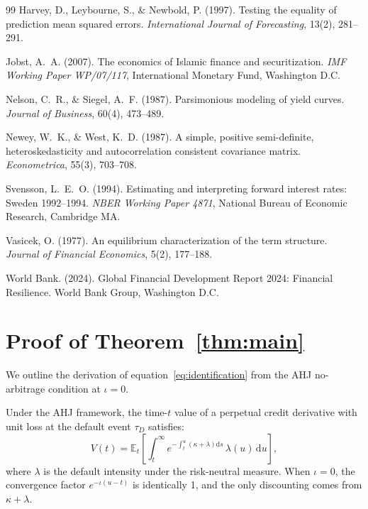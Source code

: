 \documentclass[12pt]{article}
\newcommand{\E}{\mathbb{E}}
\newcommand{\dd}{\mathrm{d}}
\theoremstyle{plain}
\theoremstyle{definition}
\theoremstyle{remark}
\begin{document}
\begin{thebibliography}{99}
Harvey, D., Leybourne, S., \& Newbold, P. (1997).
\newblock Testing the equality of prediction mean squared errors.
\newblock \textit{International Journal of Forecasting}, 13(2), 281--291.

Jobst, A.~A. (2007).
\newblock The economics of Islamic finance and securitization.
\newblock \textit{IMF Working Paper WP/07/117}, International Monetary Fund,
  Washington D.C.

Nelson, C.~R., \& Siegel, A.~F. (1987).
\newblock Parsimonious modeling of yield curves.
\newblock \textit{Journal of Business}, 60(4), 473--489.

Newey, W.~K., \& West, K.~D. (1987).
\newblock A simple, positive semi-definite, heteroskedasticity and
  autocorrelation consistent covariance matrix.
\newblock \textit{Econometrica}, 55(3), 703--708.

Svensson, L.~E.~O. (1994).
\newblock Estimating and interpreting forward interest rates: Sweden 1992--1994.
\newblock \textit{NBER Working Paper 4871}, National Bureau of Economic
  Research, Cambridge MA.

Vasicek, O. (1977).
\newblock An equilibrium characterization of the term structure.
\newblock \textit{Journal of Financial Economics}, 5(2), 177--188.

World Bank. (2024).
\newblock Global Financial Development Report 2024: Financial Resilience.
\newblock World Bank Group, Washington D.C.

\end{thebibliography}


\appendix

\section{Proof of Theorem~\ref{thm:main}}
\label{app:proof}

We outline the derivation of equation~\eqref{eq:identification} from the AHJ
no-arbitrage condition at $\iota = 0$.

Under the AHJ framework, the time-$t$ value of a perpetual credit derivative
with unit loss at the default event $\tau_D$ satisfies:
\begin{equation}
  V(t) = \E_t\!\left[\int_t^\infty e^{-\int_t^u (\kappa + \lambda)\dd s}\,
            \lambda(u)\,\dd u\right],
  \label{eq:ahj_raw}
\end{equation}
where $\lambda$ is the default intensity under the risk-neutral measure. When
$\iota = 0$, the convergence factor $e^{-\iota(u-t)}$ is identically 1,
and the only discounting comes from $\kappa + \lambda$.
\end{document}
